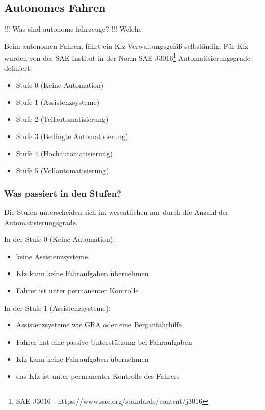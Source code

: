 \subsection{Autonomes Fahren}

!!! Was sind autonome fahrzeuge?
!!! Welche 


Beim autonomen Fahren, fährt ein \ac{Kfz} Verwaltungsgefäß selbständig.
Für \ac{Kfz} wurden von der \ac{SAE} Institut in der Norm SAE J3016\footnote{SAE J3016 - https://www.sae.org/standards/content/j3016} Automatisierungsgrade definiert.
\begin{itemize}
	\item Stufe 0 (Keine Automation)
	\item Stufe 1 (Assistenzsysteme)
	\item Stufe 2 (Teilautomatisierung)
	\item Stufe 3 (Bedingte Automatisierung)
	\item Stufe 4 (Hochautomatisierung)
	\item Stufe 5 (Vollautomatisierung)
\end{itemize}
\subsubsection{Was passiert in den Stufen?}
Die Stufen unterscheiden sich im wesentlichen nur durch die Anzahl der Automatisierungsgrade.

\vspace{0.5cm}

In der Stufe 0 (Keine Automation):
\begin{itemize}
	\item keine Assistenzsysteme
	\item \ac{Kfz} kann keine Fahraufgaben übernehmen
	\item Fahrer ist unter permanenter Kontrolle
\end{itemize}

\vspace{0.5cm}

In der Stufe 1 (Assistenzsysteme):
\begin{itemize}
	\item Assistenzsysteme wie \ac{GRA} oder eine Berganfahrhilfe
	\item Fahrer hat eine passive Unterstützung bei Fahraufgaben
	\item \ac{Kfz} kann keine Fahraufgaben übernehmen
	\item das \ac{Kfz} ist unter permanenter Kontrolle des Fahrers
\end{itemize}

